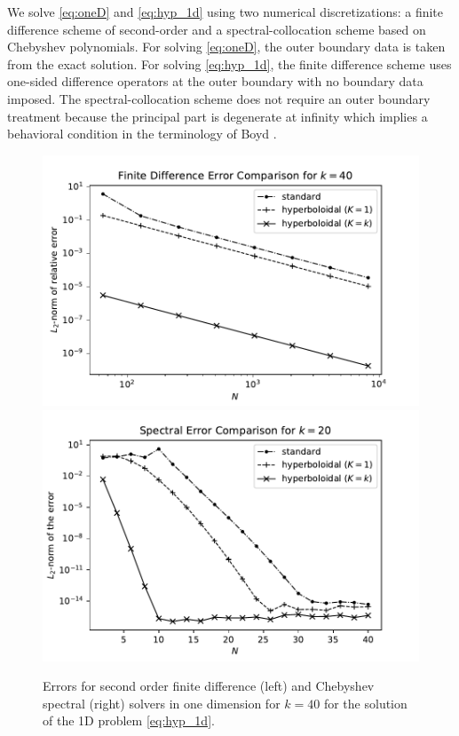 \documentclass[draft,onefignum,onetabnum]{siamart190516}
\begin{document}
We solve \eqref{eq:oneD} and \eqref{eq:hyp_1d} using two numerical discretizations: a finite difference scheme of second-order and a spectral-collocation scheme based on Chebyshev polynomials. For solving \eqref{eq:oneD}, the outer boundary data is taken from the exact solution. For solving \eqref{eq:hyp_1d}, the finite difference scheme uses one-sided difference operators at the outer boundary with no boundary data imposed. The spectral-collocation scheme does not require an outer boundary treatment because the principal part is degenerate at infinity which implies a behavioral condition in the terminology of Boyd \cite{boyd2001chebyshev}.

\begin{figure}[tbhp]
	\centering
	\includegraphics[scale=0.4]{figs/fd_err_1d}
	\includegraphics[scale=0.4]{figs/sp_err_1d}
	\caption{Errors for second order finite difference (left) and Chebyshev spectral (right) solvers in one dimension for $k=40$ for the solution of the 1D problem \eqref{eq:hyp_1d}.}
	\label{fig:errs_oned}
\end{figure}
\end{document}
